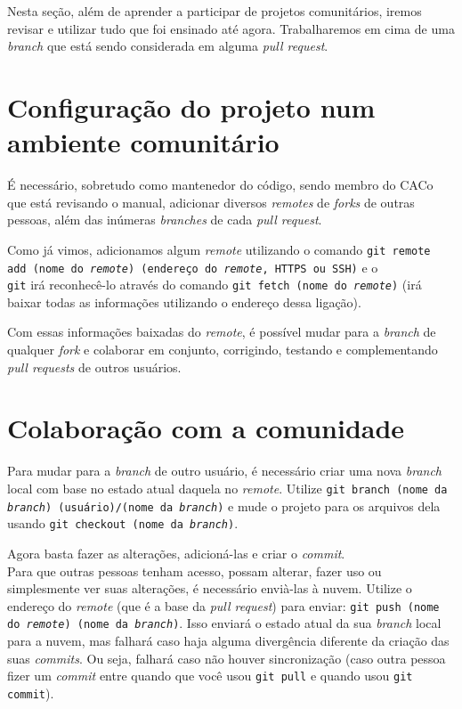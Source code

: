 \documentclass[a4paper,oneside,10pt]{memoir}
\begin{document}
Nesta seção, além de aprender a participar de projetos comunitários, iremos
revisar e utilizar tudo que foi ensinado até agora. Trabalharemos em cima de uma
\emph{branch} que está sendo considerada em alguma \emph{pull request}.

\section{Configuração do projeto num ambiente comunitário}

É necessário, sobretudo como mantenedor do código, sendo membro do CACo que está
revisando o manual, adicionar diversos \emph{remotes} de \emph{forks} de outras
pessoas, além das inúmeras \emph{branches} de cada \emph{pull request}.

Como já vimos, adicionamos algum \emph{remote} utilizando o comando \texttt{git
re\-mo\-te add (nome do \emph{remote}) (endereço do \emph{remote}, HTTPS ou
SSH)} e o \\\texttt{git} irá reconhecê-lo através do comando \texttt{git fetch
(nome do \emph{remote})} (irá baixar todas as informações utilizando o endereço
dessa ligação).

Com essas informações baixadas do \emph{remote}, é possível mudar para a
\emph{branch} de qualquer \emph{fork} e colaborar em conjunto, corrigindo,
testando e complementando \emph{pull requests} de outros usuários.

\section{Colaboração com a comunidade}

Para mudar para a \emph{branch} de outro usuário, é necessário criar uma nova
\emph{branch} local com base no estado atual daquela no \emph{remote}. Utilize
\texttt{git branch (nome da \emph{branch}) (usuário)/(nome da \emph{branch})} e
mude o projeto para os arquivos dela usando \texttt{git checkout (nome da
\emph{branch})}.

Agora basta fazer as alterações, adicioná-las e criar o \emph{commit}.
\\

Para que outras pessoas tenham acesso, possam alterar, fazer uso ou simplesmente
ver suas alterações, é necessário envià-las à nuvem. Utilize o endere\-ço do
\emph{remote} (que é a base da \emph{pull request}) para enviar: \texttt{git
push (nome do \emph{re\-mo\-te}) (nome da \emph{branch})}. Isso enviará o estado
atual da sua \emph{branch} local para a nuvem, mas falhará caso haja alguma
divergência diferente da criação das suas \emph{commits}. Ou seja, falhará caso
não houver sincronização (caso outra pessoa fizer um \emph{commit} entre quando
que você usou \texttt{git pull} e quando usou \texttt{git commit}).
\end{document}
